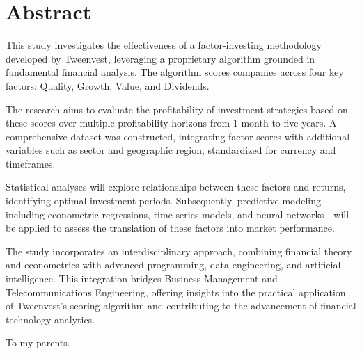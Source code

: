 \documentclass[11pt,english,a4paper,hidelinks]{book}
\begin{document}
\renewcommand{\listtablename}{List of Tables} 
\renewcommand{\tablename}{Table} 

 
\newpage
\thispagestyle{empty}

\section*{Abstract}
\noindent This study investigates the effectiveness of a factor-investing methodology developed by Tweenvest, leveraging a proprietary algorithm grounded in fundamental financial analysis. The algorithm scores companies across four key factors: Quality, Growth, Value, and Dividends.

\vspace{0.5cm}

\noindent The research aims to evaluate the profitability of investment strategies based on these scores over multiple profitability horizons from 1 month to five years. A comprehensive dataset was constructed, integrating factor scores with additional variables such as sector and geographic region, standardized for currency and timeframes.

\vspace{0.5cm}

\noindent Statistical analyses will explore relationships between these factors and returns, identifying optimal investment periods. Subsequently, predictive modeling—including econometric regressions, time series models, and neural networks—will be applied to assess the translation of these factors into market performance.

\vspace{0.5cm}

\noindent The study incorporates an interdisciplinary approach, combining financial theory and econometrics with advanced programming, data engineering, and artificial intelligence. This integration bridges Business Management and Telecommunications Engineering, offering insights into the practical application of Tweenvest's scoring algorithm and contributing to the advancement of financial technology analytics.


\newpage
\thispagestyle{empty}
\vfill
\begin{flushright}
To my parents.
\end{flushright}
\vfill\vfill
\end{document}
